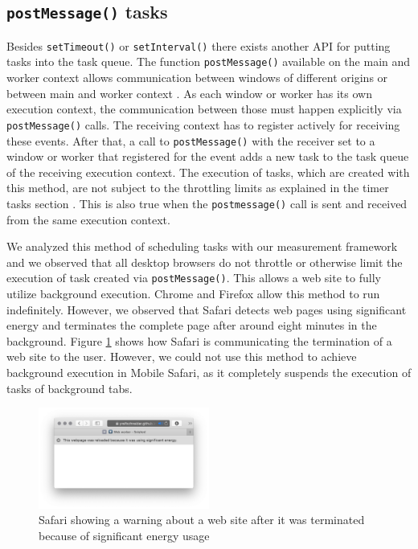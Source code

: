 \documentclass[
	ruledheaders=section,%
	class=report,%
	thesis={type=bachelor},%
	accentcolor=9c,%
	custommargins=true,%
	marginpar=false,%
	parskip=half-,%
	fontsize=11pt,%
]{tudapub}
\begin{document}
  \subsection{\texttt{postMessage()} tasks}

  Besides \texttt{setTimeout()} or \texttt{setInterval()} there exists another API for putting tasks into the task queue. The function \texttt{postMessage()} available on the main and worker context allows communication between windows of different origins or between main and worker context \cite{mdn-postmessage}. As each window or worker has its own execution context, the communication between those must happen explicitly via \texttt{postMessage()} calls. The receiving context has to register actively for receiving these events. After that, a call to \texttt{postMessage()} with the receiver set to a window or worker that registered for the event adds a new task to the task queue of the receiving execution context. The execution of tasks, which are created with this method, are not subject to the throttling limits as explained in the timer tasks section \cite{zero-delay-timeouts}. This is also true when the \texttt{postmessage()} call is sent and received from the same execution context.

  We analyzed this method of scheduling tasks with our measurement framework and we observed that all desktop browsers do not throttle or otherwise limit the execution of task created via \texttt{postMessage()}. This allows a web site to fully utilize background execution. Chrome and Firefox allow this method to run indefinitely. However, we observed that Safari detects web pages using significant energy and terminates the complete page after around eight minutes in the background. Figure \ref{fig:significant-energy} shows how Safari is communicating the termination of a web site to the user. However, we could not use this method to achieve background execution in Mobile Safari, as it completely suspends the execution of tasks of background tabs.

  \begin{figure}
    \centering
      \includegraphics[width=0.5\textwidth]{images/significant-energy.png}
    \caption{Safari showing a warning about a web site after it was terminated because of significant energy usage}
    \label{fig:significant-energy}
  \end{figure}
\end{document}
